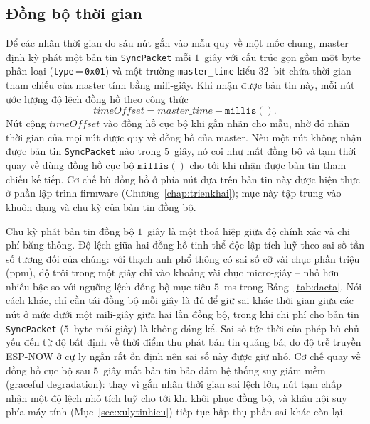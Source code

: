 \documentclass[../DoAn.tex]{subfiles}
\begin{document}
\subsection{Đồng bộ thời gian}
\label{subsec:tx_sync}
Để các nhãn thời gian do sáu nút gắn vào mẫu quy về một mốc chung, master định kỳ
phát một bản tin \texttt{SyncPacket} mỗi $1$~giây với cấu trúc gọn gồm một byte
phân loại (\texttt{type}\,=\,\texttt{0x01}) và một trường \texttt{master\_time}
kiểu $32$~bit chứa thời gian tham chiếu của master tính bằng mili-giây. Khi nhận
được bản tin này, mỗi nút ước lượng độ lệch đồng hồ theo công thức
\begin{equation}
    \label{eq:timeoffset}
    \mathit{timeOffset} = \mathit{master\_time} - \mathtt{millis}().
\end{equation}
Nút cộng \(\mathit{timeOffset}\) vào đồng hồ cục bộ khi gắn nhãn cho mẫu, nhờ đó
nhãn thời gian của mọi nút được quy về đồng hồ của master. Nếu một nút không nhận
được bản tin \texttt{SyncPacket} nào trong $5$~giây, nó coi như mất đồng bộ và tạm
thời quay về dùng đồng hồ cục bộ \(\mathtt{millis}()\) cho tới khi nhận được bản
tin tham chiếu kế tiếp. Cơ chế bù đồng hồ ở phía nút dựa trên bản tin này được hiện thực ở phần lập
trình firmware (Chương~\ref{chap:trienkhai}); mục này tập trung vào khuôn dạng và
chu kỳ của bản tin đồng bộ.

Chu kỳ phát bản tin đồng bộ $1$~giây là một thoả hiệp giữa độ chính xác và chi
phí băng thông. Độ lệch giữa hai đồng hồ tinh thể độc lập tích luỹ theo sai số
tần số tương đối của chúng: với thạch anh phổ thông có sai số cỡ vài chục phần
triệu (ppm), độ trôi trong một giây chỉ vào khoảng vài chục micro-giây -- nhỏ hơn
nhiều bậc so với ngưỡng lệch đồng bộ mục tiêu $5$~ms trong Bảng~\ref{tab:dacta}.
Nói cách khác, chỉ cần tái đồng bộ mỗi giây là đủ để giữ sai khác thời gian giữa
các nút ở mức dưới một mili-giây giữa hai lần đồng bộ, trong khi chi phí cho bản
tin \texttt{SyncPacket} ($5$~byte mỗi giây) là không đáng kể. Sai số tức thời của
phép bù chủ yếu đến từ độ bất định về thời điểm thu phát bản tin quảng bá; do độ
trễ truyền ESP-NOW ở cự ly ngắn rất ổn định nên sai số này được giữ nhỏ. Cơ chế
quay về đồng hồ cục bộ sau $5$~giây mất bản tin bảo đảm hệ thống suy giảm mềm
(graceful degradation): thay vì gắn nhãn thời gian sai lệch lớn, nút tạm chấp
nhận một độ lệch nhỏ tích luỹ cho tới khi khôi phục đồng bộ, và khâu nội suy phía
máy tính (Mục~\ref{sec:xulytinhieu}) tiếp tục hấp thụ phần sai khác còn lại.
\end{document}
